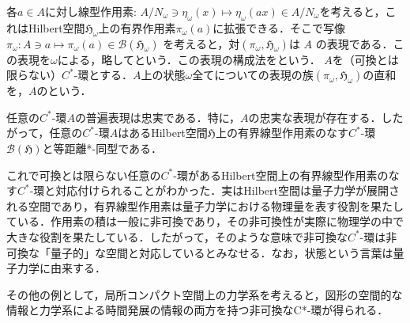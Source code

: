 各$a\in A$に対し線型作用素: $A/N_{\omega}\ni \eta_{\omega}\left(x\right)\mapsto \eta_{\omega}\left(ax\right)\in A/N_{\omega}$を考えると，これはHilbert空間$\mathfrak{H}_{\omega}$上の有界作用素$\pi_{\omega}\left(a\right)$に拡張できる．そこで写像$\pi_{\omega}:A\ni a\mapsto \pi_{\omega}\left(a\right)\in \mathcal{B}\left(\mathfrak{H}_{\omega}\right)$
を考えると，対$\left(\pi_{\omega},\mathfrak{H}_{\omega}\right)$は $A$ の表現である．この表現を$\omega$による，略してという．この表現の構成法をという．
$A$を（可換とは限らない）$C^*$-環とする．$A$上の状態$\omega$全てについての表現の族$\left(\pi_{\omega},\mathfrak{H}_{\omega}\right)$の直和を，$A$のという．
\begin{theo}
任意の$C^*$-環$A$の普遍表現は忠実である．特に，$A$の忠実な表現が存在する．したがって，任意の$C^*$-環$A$はある{\rm Hilbert}空間$\mathfrak{H}$上の有界線型作用素のなす$C^*$-環$\mathcal{B}\left(\mathfrak{H}\right)$と等距離*-同型である．
\end{theo}
これで可換とは限らない任意の$C^*$-環があるHilbert空間上の有界線型作用素のなす$C^*$-環と対応付けられることがわかった．実はHilbert空間は量子力学が展開される空間であり，有界線型作用素は量子力学における物理量を表す役割を果たしている．作用素の積は一般に非可換であり，その非可換性が実際に物理学の中で大きな役割を果たしている．したがって，そのような意味で非可換な$C^*$-環は非可換な「量子的」な空間と対応しているとみなせる．なお，状態という言葉は量子力学に由来する．

その他の例として，局所コンパクト空間上の力学系を考えると，図形の空間的な情報と力学系による時間発展の情報の両方を持つ非可換なC*-環が得られる．

